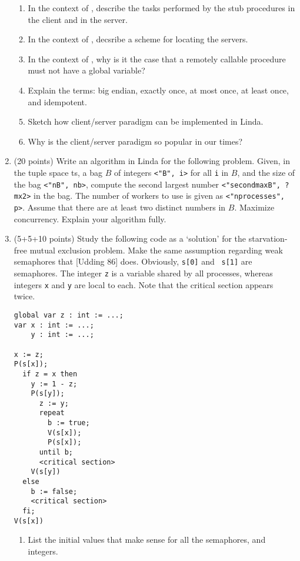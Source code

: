 \begin{enumerate}
\begin{enumerate}
\item
In the context of \RPC, 
describe the tasks performed by the stub
procedures in the client and in the server.

\item
In the context of \RPC, 
decsribe a scheme for locating the servers.

\item
In the context of \RPC, 
why is it the case that a remotely callable procedure must not
have a global variable?

\item
Explain the terms: big endian, exactly once, at most once, at least
once, and idempotent.

\item
Sketch how client/server paradigm can be implemented in Linda.

\item
Why is the client/server paradigm so popular in our times?


\end{enumerate}


\item (20 points)
Write an algorithm in Linda for the following problem.  Given, in the
tuple space {\sc ts}, a bag $B$ of integers {\tt <"B", i>} for all
{\tt i} in $B$, and the size of the bag {\tt <"nB", nb>}, compute the
second largest number {\tt <"secondmaxB", ? mx2>} in the bag.
The number of workers to use is given as {\tt <"nprocesses", p>}. 
Assume that there are at least two distinct numbers in $B$.
Maximize concurrency.
Explain your algorithm fully.

\item (5+5+10 points)
Study the following code as a `solution' for the star\-vation-free
mutual exclusion problem.  Make the same assumption regarding weak
semaphores that [Udding 86] does.  Obviously, {\tt s[0]} and {\tt
s[1]} are semaphores.  The integer {\tt z} is a variable shared by all
processes, whereas integers {\tt x} and {\tt y} are local to each.
Note that the critical section appears twice.

\begin{minipage}{2in}
\begin{verbatim}
global var z : int := ...;
var x : int := ...;
    y : int := ...;

x := z;
P(s[x]);
  if z = x then
    y := 1 - z;
    P(s[y]);
      z := y;
      repeat
        b := true;
        V(s[x]);
        P(s[x]);
      until b;
      <critical section>
    V(s[y])
  else
    b := false;
    <critical section>
  fi;
V(s[x])
\end{verbatim}
\end{minipage}
\begin{minipage}{3in}
\begin{enumerate}
\item
List the initial values that make sense for all the semaphores, and
integers.


\end{enumerate}
\end{minipage}
\end{enumerate}
